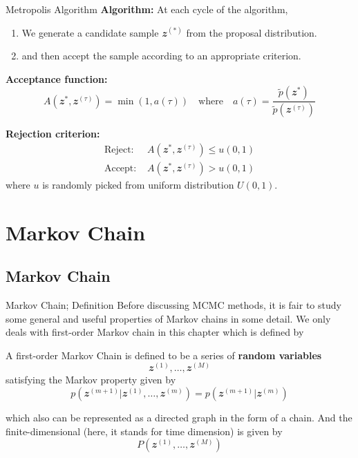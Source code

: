 \documentclass{bredelebeamer}
\begin{document}
\begin{frame}{Metropolis Algorithm}
  \textbf{Algorithm:}
  At each cycle of the algorithm,
  \begin{enumerate}
    \item We generate a candidate sample $\mathbfit{z}^{(*)}$
    from the proposal distribution.
    \item and then accept the sample according to an appropriate criterion.
    \\[2.0\baselineskip]
  \end{enumerate}

  \textbf{Acceptance function:}
  \begin{equation}
    A(\mathbfit{z}^{*}, \mathbfit{z}^{(\tau)})
    = \min( 1, a(\tau) )
    \quad \text{where} \quad a(\tau) =
    \frac{\tilde{p}(\mathbfit{z}^{*})}
    {\tilde{p}(\mathbfit{z}^{(\tau)})}
  \end{equation}

  \textbf{Rejection criterion:}
  \begin{equation}
    \begin{split}
      \textrm{Reject: } &A(\mathbfit{z}^{*}, \mathbfit{z}^{(\tau)}) \leq u(0,1) \\
      \textrm{Accept: } &A(\mathbfit{z}^{*}, \mathbfit{z}^{(\tau)}) > u(0,1)
    \end{split}
  \end{equation}
  where $u$ is randomly picked from uniform distribution $U(0,1)$.
\end{frame}


\section{Markov Chain}
\subsection{Markov Chain}
\begin{frame}{Markov Chain; Definition}
  Before discussing MCMC methods, it is fair to study some general and useful
  properties of Markov chains in some detail. We only deals with first-order
  Markov chain in this chapter which is defined by
  \begin{definition}
    A first-order Markov Chain is defined to be a series of \textbf{random variables}
    \begin{equation}
      \mathbfit{z}^{(1)}, \ldots, \mathbfit{z}^{(M)}
    \end{equation}
    satisfying the Markov property given by
    \begin{equation*}
      p(\mathbfit{z}^{(m+1)}|\mathbfit{z}^{(1)}, \ldots, \mathbfit{z}^{(m)})
      = p(\mathbfit{z}^{(m+1)}|\mathbfit{z}^{(m)})
    \end{equation*}
  \end{definition}
  which also can be represented as a directed graph in the form of a chain.
  And the finite-dimensional (here, it stands for time dimension) is given by
  \begin{equation}
    P (\mathbfit{z}^{(1)}, \ldots, \mathbfit{z}^{(M)})
  \end{equation}

\end{frame}
\end{document}
